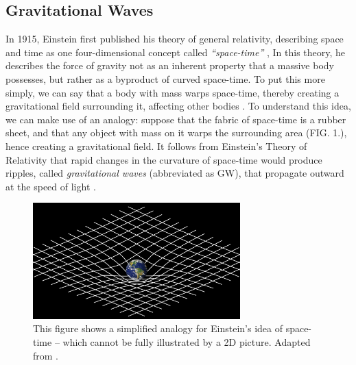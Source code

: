 \documentclass[reprint,
letterpaper,
 amsmath,amssymb,
 aps,
]{revtex4-2}
\begin{document}
\subsection{Gravitational Waves}
In 1915, Einstein first published his theory of general relativity, describing space and time as one four-dimensional concept called \textit{``space-time''} \cite{maggiore_2008}, In this theory, he describes the force of gravity not as an inherent property that a massive body possesses, but rather as a byproduct of curved space-time. To put this more simply, we can say that a body with mass warps space-time, thereby creating a gravitational field surrounding it, affecting other bodies \cite{carlip}. To understand this idea, we can make use of an analogy: suppose that the fabric of space-time is a rubber sheet, and that any object with mass on it warps the surrounding area (FIG. 1.), hence creating a gravitational field. It follows from Einstein's Theory of Relativity that rapid changes in the curvature of space-time would produce ripples, called \textit{gravitational waves} (abbreviated as GW), that propagate outward at the speed of light  \cite{JSTORLIGO}.

\begin{figure}[h]
\includegraphics[width=8cm]{genral.png}
\caption{This figure shows a simplified analogy for Einstein's idea of space-time – which cannot be fully illustrated by a 2D picture. Adapted from \cite{mattson}.}
\centering
\end{figure}
\end{document}
